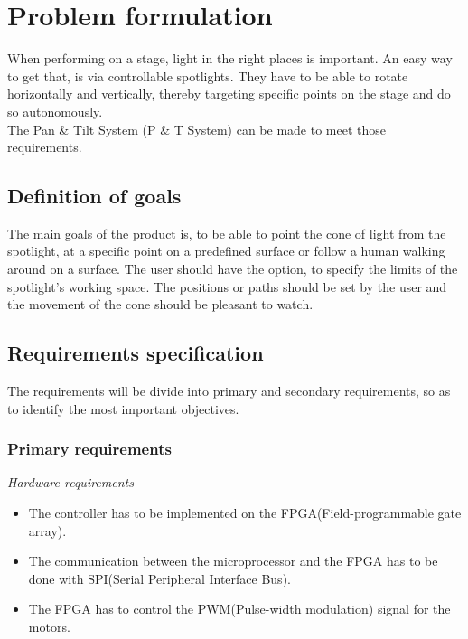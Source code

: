 \newpage

\section{Problem formulation}

When performing on a stage, light in the right places is important. An easy way to get that, is via controllable spotlights. They have to be able to rotate horizontally and vertically, thereby targeting specific points on the stage and do so autonomously.\\
The Pan \& Tilt System (P \& T System) can be made to meet those requirements.


\subsection{Definition of goals}
The main goals of the product is, to be able to point the cone of light from the spotlight, at a specific point on a predefined surface or follow a human walking around on a surface. The user should have the option, to specify the limits of the spotlight's working space. The positions or paths should be set by the user and the movement of the cone should be pleasant to watch.


\subsection{Requirements specification}
\label{sec:RequirementsSpecification}

The requirements will be divide into primary and secondary requirements, so as to identify the most important objectives.


\subsubsection{Primary requirements}

\textit{Hardware requirements}

\begin{itemize}

\item The controller has to be implemented on the FPGA(Field-programmable gate array).

\item The communication between the microprocessor and the FPGA has to be done with SPI(Serial Peripheral Interface Bus).

\item The FPGA has to control the PWM(Pulse-width modulation) signal for the motors.
\end{itemize}


